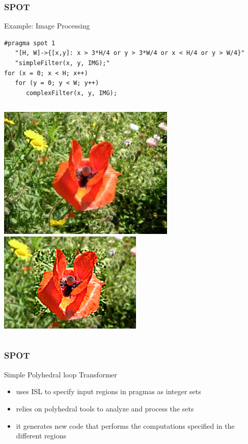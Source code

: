 \documentclass{beamer}\usetheme{Madrid} %
\begin{document}
\begin{frame}[fragile]
\frametitle { SPOT } Example: Image Processing
\begin{verbatim}
#pragma spot 1
   "[H, W]->{[x,y]: x > 3*H/4 or y > 3*W/4 or x < H/4 or y > W/4}" 
   "simpleFilter(x, y, IMG);"
for (x = 0; x < H; x++) 
   for (y = 0; y < W; y++)
      complexFilter(x, y, IMG);
\end{verbatim}
\begin{columns}
\includegraphics[scale=0.32]{img/rose.jpg}
\includegraphics[scale=0.43]{img/flower_proc.png}
\end{columns}
\end{frame}
\begin{frame}
    \frametitle { SPOT } Simple Polyhedral loop Transformer
    \begin{itemize}
		\item 
			uses ISL to specify input regions in pragmas as integer sets
		\item
			relies on polyhedral tools to analyze and process the sets
		\item 
			it generates new code that performs the computations 
			specified in the different regions
    \end{itemize}
\end{frame}
\end{document}
